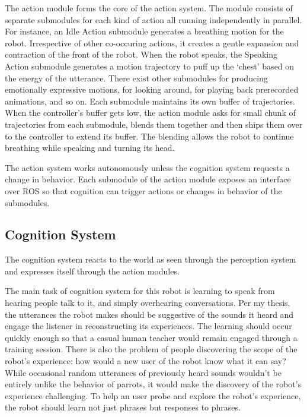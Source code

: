 The action module forms the core of the action system. The module consists of separate submodules for each kind of action all running independently in parallel. For instance, an Idle Action submodule generates a breathing motion for the robot. Irrespective of other co-occuring actions, it creates a gentle expansion and contraction of the front of the robot. When the robot speaks, the Speaking Action submodule generates a motion trajectory to puff up the `chest' based on the energy of the utterance. There exist other submodules for producing emotionally expressive motions, for looking around, for playing back prerecorded animations, and so on. Each submodule maintains its own buffer of trajectories. When the controller's buffer gets low, the action module asks for small chunk of trajectories from each submodule, blends them together and then ships them over to the controller to extend its buffer. The blending allows the robot to continue breathing while speaking and turning its head. 

The action system works autonomously unless the cognition system requests a change in behavior. Each submodule of the action module exposes an interface over ROS so that cognition can trigger actions or changes in behavior of the submodules.

\subsection{Cognition System}

The cognition system reacts to the world as seen through the perception system and expresses itself through the action modules.  

The main task of cognition system for this robot is learning to speak from hearing people talk to it, and simply overhearing conversations. Per my thesis, the utterances the robot makes should be suggestive of the sounds it heard and engage the listener in reconstructing its experiences. The learning should occur quickly enough so that a casual human teacher would remain engaged through a training session. There is also the problem of people discovering the scope of the robot's experience: how would a new user of the robot know what it can say? While occasional random utterances of previously heard sounds wouldn't be entirely unlike the behavior of parrots, it would make the discovery of the robot's experience challenging. To help an user probe and explore the robot's experience, the robot should learn not just phrases but responses to phrases. 

